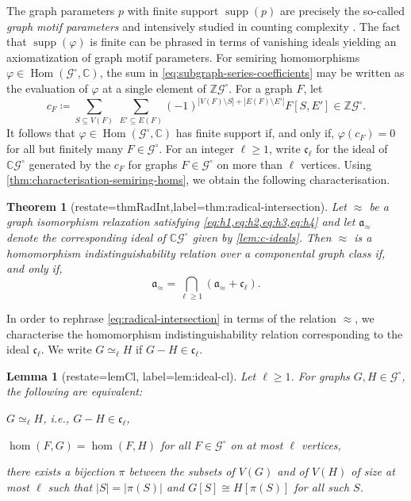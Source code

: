 \documentclass[11pt]{scrartcl}
\theoremstyle{definition}
\theoremstyle{plain}
\newtheorem{lemma}[definition]{Lemma}
\newtheorem{theorem}[definition]{Theorem}
\theoremstyle{remark}
\renewcommand\phi\varphi
\DeclareMathOperator\Hom{Hom}
\DeclareMathOperator{\supp}{supp}
\newcommand{\lG}{\mathcal{G}^\circ}
\newcommand{\C}{\mathbb{C}}
\begin{document}
    The graph parameters $p$ with finite support $\supp(p)$ are precisely the so-called \emph{graph motif parameters} and intensively studied in counting complexity \cite{roth_parameterised_2026,curticapean_homomorphisms_2017,chen_counting_2016}.
	The fact that $\supp(\phi)$ is finite can be phrased in terms of vanishing ideals yielding an axiomatization of graph motif parameters.
	For semiring homomorphisms $\phi \in \Hom(\lG, \C)$, 
	the sum in \cref{eq:subgraph-series-coefficients}
	may be written as the evaluation of $\phi$ at a single element of $\mathbb{Z}\lG$.
	For a graph $F$, let
	\begin{equation}\label{eq:c-F}
		c_F \coloneqq \sum_{S \subseteq V(F)} \ \sum_{E' \subseteq E(F)} (-1)^{|V(F) \setminus S| + |E(F) \setminus E'|} F[S, E'] \in \mathbb{Z}\lG.
	\end{equation}
	It follows that $\phi \in \Hom(\lG, \mathbb{C})$ has finite support if, and only if,
	$\phi(c_F) = 0$ for all but finitely many $F \in \lG$.
	For an integer $\ell \geq 1$, write $\mathfrak{c}_\ell$ for the ideal of $\mathbb{C}\lG$ 
	generated by the $c_F$ for graphs $F \in \lG$ on more than $\ell$ vertices.
    Using \cref{thm:characterisation-semiring-homs}, we obtain the following characterisation.

	\begin{theorem}[restate=thmRadInt,label=thm:radical-intersection]
		Let $\approx$ be a graph isomorphism relaxation satisfying \cref{eq:h1,eq:h2,eq:h3,eq:h4}
		and let $\mathfrak{a}_{\approx}$ denote the corresponding ideal of $\mathbb{C}\lG$
		given by \cref{lem:c-ideals}.
		Then $\approx$ is a homomorphism indistinguishability relation over a componental graph class
		if, and only if,
		\begin{equation}\label{eq:radical-intersection}
			\mathfrak{a}_{\approx} = \bigcap_{ \ell \geq 1} (\mathfrak{a}_{\approx} + \mathfrak{c}_\ell).
		\end{equation}
	\end{theorem}

	

	In order to rephrase \eqref{eq:radical-intersection}
	in terms of the relation $\approx$, we characterise the homomorphism indistinguishability relation corresponding to the ideal $\mathfrak{c}_\ell$.
	We write $G \simeq_\ell H$ if $G - H \in \mathfrak{c}_\ell$.

	\begin{lemma}[restate=lemCl, label=lem:ideal-cl]
		Let $\ell \geq 1$. For graphs $G, H \in \lG$, the following are equivalent:
		\begin{assertions}
			\item $G \simeq_\ell H$, i.e., $G - H \in \mathfrak{c}_\ell$,
			\item $\hom(F, G) = \hom(F, H)$ for all $F\in \lG$ on at most $\ell$ vertices,
			\item there exists a bijection $\pi$ between the subsets of $V(G)$ and of $V(H)$ of size at most $\ell$ such that $|S| = |\pi(S)|$ and $G[S] \cong H[\pi(S)]$ for all such $S$.
		\end{assertions}
 	\end{lemma}
\end{document}
